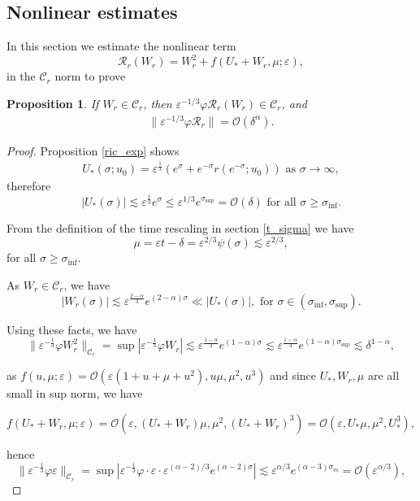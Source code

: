 \documentclass[letterpaper,11pt]{article}
\newcommand{\rmO}{\mathcal{O}}
\newcommand{\eps}{\varepsilon}
\newcommand{\lar}{ \lesssim }
\numberwithin{equation}{section}
\theoremstyle{plain}
\newtheorem{proposition}[theorem]{Proposition}
\begin{document}
\subsection{Nonlinear estimates}

In this section we estimate the nonlinear term
\[
\mathcal{R}_r(W_r) = W_r^2 + f(U_*+W_r, \mu ; \eps),
\]
in the $\mathcal{C}_r$ norm to prove 
\begin{proposition}\label{nl_est_r}
If $W_r \in \mathcal{C}_{r}$, then $\eps^{-1/3}\varphi \mathcal{R}_r(W_r) \in \mathcal{C}_{r}$, and
\begin{align}
\|\eps^{-1/3}\varphi \mathcal{R}_r \| = \rmO(\delta^{\alpha}).
\end{align}
\end{proposition}
\begin{proof}

Proposition \ref{ric_exp} shows
\begin{align*}
U_*(\sigma;u_0) =  \eps^{\frac{1}{3}}(e^\sigma+e^{-\sigma} r(e^{-\sigma}; u_0)   ) \text{ as }\sigma \to \infty,
\end{align*}
therefore 
\[
|U_*(\sigma)| \lar \eps^{\frac{1}{3}}e^\sigma \le \eps^{1/3}e^{\sigma_{\sup}} = \rmO(\delta) \text{ for all } \sigma \ge \sigma_{\inf}.
\]

From the definition of the time rescaling in section \ref{t_sigma} we have
\[
\mu = \eps t-\delta  =\eps^{2/3}\psi(\sigma) \lar \eps^{2/3},
\]
for all $\sigma \ge \sigma_{\inf}$.

As $W_r \in \mathcal{C}_r$, we have 
\[
|W_r(\sigma)| \lar \eps^{\frac{2-\alpha}{3}} e^{(2-\alpha)\sigma} \ll |U_*(\sigma)|, \text{ for } \sigma \in (\sigma_{\inf}, \sigma_{\sup}).
\]

Using these facts, we have
\[
\|\eps^{-\frac{1}{3}}\varphi W_r^2\|_{\mathcal{C}_r}=\sup |\eps^{-\frac{1}{3}} \varphi W_r| \lar \eps^{\frac{1-\alpha}{3}} e^{(1-\alpha)\sigma} \lar \eps^{\frac{1-\alpha}{3}} e^{(1-\alpha)\sigma_{\sup}} \lar \delta^{1-\alpha},
\]

as $f(u,\mu; \eps) = \rmO(\eps(1+u+\mu+u^2),u\mu,\mu^2,u^3)$ and since $U_*,W_r,\mu$ are all small in sup norm, we have

\[
f(U_*+W_r, \mu ;\eps) = \rmO(\eps, (U_*+W_r)\mu, \mu^2, (U_*+W_r)^3 ) = \rmO(\eps, U_*\mu, \mu^2, U_*^3),
\]

hence
\[
\|\eps^{-\frac{1}{3}}\varphi \eps \|_{\mathcal{C}_r}=\sup |\eps^{-\frac{1}{3}} \varphi  \cdot \eps \cdot \eps^{(\alpha-2)/3}e^{(\alpha-2)\sigma}| \lar \eps^{\alpha/3} e^{(\alpha-3)\sigma_m} = \rmO(\eps^{\alpha/3}) ,
\]


\end{proof}
\end{document}
